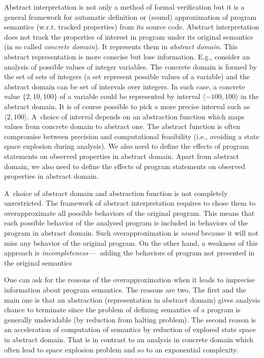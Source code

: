 \documentclass[a4paper, 12pt]{article}
\newcommand{\interval}[2]{\langle #1,#2 \rangle}
\begin{document}
Abstract interpretation is not only a method of formal verification but
it is a general framework for automatic definition or (sound) approximation of
program semantics (w.r.t. tracked properties) from its source code.
Abstract interpretation does not track the properties of interest
in program under its original semantics (in so called \emph{concrete domain}).
It represents them in \emph{abstract domain}.
This abstract representation is more conscise but lose information.
E.g., consider an analysis of possible values of integer variables.
The concrete domain is formed by the set of sets of integers (a set represent possible
values of a variable) and the abstract domain can be set of intervals over integers.
In such case, a concrete value $\{2,10,100\}$ of a variable could
be represented by interval $\interval{-100}{100}$ in the abstract domain.
It is of course possible to pick a more precise interval such as $\interval{2}{100}$.
A~choice of interval depends on an abstraction function
which maps values from concrete domain to abstract one.
The abstract function is often compromise between precision and computational
feasibility (i.e., avoiding a state space explosion during analysis).
We also need to define the effects of program statements
on observed properties in abstract domain.
Apart from abstract domain, we also need to define the effects
of program statements on observed properties in abstract domain.

A~choice of abstract domain and abstraction function is not completely unrestricted.
The framework of abstract interpretation requires to chose them to
overapproximate all possible behaviors of the original program.
This means that each possible behavior of the analysed program is included in
behaviors of the program in abstract domain.
Such overapproximation is \emph{sound} because it will not miss any
behavior of the original program.
On the other hand, a weakness of this approach is \emph{incompleteness}\,---\,
adding the behaviors of program not presented in the original semantics

One can ask for the reasons of the overapproximation when it leads to
imprecise information about program semantics.
The reasons are two.
The first and the main one is that an abstraction (representation in abstract domain) gives
analysis chance to terminate since the problem of defining semantics of a program is
generally undecidable (by reduction from halting problem).
The second reason is an acceleration of computation of semantics
by reduction of explored state space in abstract domain.
That is in contrast to an analysis in concrete domain
which often lead to space explosion problem and so to an exponential complexity.
\end{document}
